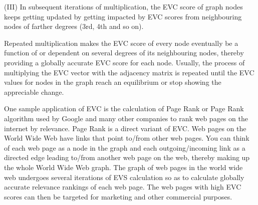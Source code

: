 \documentclass[12pt, a4paper]{report}
\begin{document}
\begin{itemize}
    (III)	In subsequent iterations of multiplication, the EVC score of graph nodes keeps getting updated by getting impacted by EVC scores from neighbouring nodes of farther degrees (3rd, 4th and so on).

    Repeated multiplication makes the EVC score of every node eventually be a function of or dependent on several degrees of its neighbouring nodes, thereby providing a globally accurate EVC score for each node. Usually, the process of multiplying the EVC vector with the adjacency matrix is repeated until the EVC values for nodes in the graph reach an equilibrium or stop showing the appreciable change.

    One sample application of EVC is the calculation of Page Rank or Page Rank algorithm used by Google and many other companies to rank web pages on the internet by relevance. Page Rank is a direct variant of EVC. Web pages on the World Wide Web have links that point to/from other web pages. You can think of each web page as a node in the graph and each outgoing/incoming link as a directed edge leading to/from another web page on the web, thereby making up the whole World Wide Web graph. The graph of web pages in the world wide web undergoes several iterations of EVS calculation so as to calculate globally accurate relevance rankings of each web page. The web pages with high EVC scores can then be targeted for marketing and other commercial purposes.
    
\end{itemize}
\end{document}
